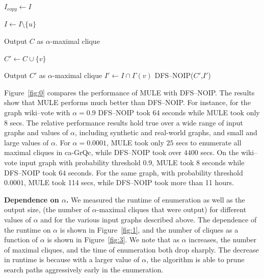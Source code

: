 \documentclass[11pt,letterpaper]{article}
\newcommand{\cliqueprob}{clq}
\begin{document}
\begin{algorithm}[ht]
\caption{DFS--NOIP($C$,$I$)}
\label{algo:naive}

$I_{copy} \leftarrow I$ \;

{
    \If{$u \le max(C)$ OR $\cliqueprob(C \cup \{ u \}) < \alpha$}
    {
        $I \leftarrow I \setminus \{ u \}$
    }
}

{
    {
        Output $C$ as $\alpha$-maximal clique \;
        \Return \;
    }
}

{

    $C' \leftarrow C \cup \{ v \}$ \;

    {
        Output $C'$ as $\alpha$-maximal clique \;
    }
    \Else
    {
        $I' \leftarrow I \cap \Gamma( v )$ \;
        DFS--NOIP($C'$,$I'$) \;
    }
}
\end{algorithm}

Figure~\ref{fig:0} compares the performance of MULE with DFS--NOIP. The results show that MULE performs much better than DFS--NOIP. For instance, for the graph wiki--vote with $\alpha=0.9$ DFS--NOIP took $64$ seconds while MULE took only $8$ secs. The relative performance results hold true over a wide range of input graphs and values of $\alpha$, including synthetic and real-world graphs, and small and large values of $\alpha$. For $\alpha = 0.0001$, MULE took only $25$ secs to enumerate all maximal cliques in ca-GrQc, while DFS--NOIP took over $4400$ secs. On the wiki--vote input graph with probability threshold 0.9, MULE took $8$ seconds while DFS--NOIP took $64$ seconds. For the same graph, with probability threshold $0.0001$, MULE took 114 secs, while DFS--NOIP took more than 11 hours.

{\bf Dependence on $\alpha$.} We measured the runtime of enumeration
as well as the output size, (the number of $\alpha$-maximal cliques
that were output) for different values of $\alpha$ and for the various
input graphs described above. The dependence of the runtime on
$\alpha$ is shown in Figure~\ref{fig:1}, and the number of cliques as
a function of $\alpha$ is shown in Figure~\ref{fig:3}. We note that as
$\alpha$ increases, the number of maximal cliques, and the time of
enumeration both drop sharply. The decrease in runtime is because with
a larger value of $\alpha$, the algorithm is able to prune search
paths aggressively early in the enumeration.
\end{document}

